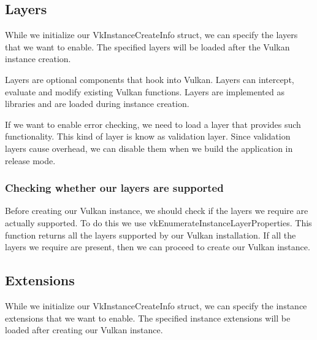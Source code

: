 \begin{minipage}{\linewidth}{\noindent}
    
\end{minipage}

\subsection{Layers}

While we initialize our VkInstanceCreateInfo struct, we can specify the layers
that we want to enable.
The specified layers will be loaded after the Vulkan instance creation.

Layers are optional components that hook into Vulkan.
Layers can intercept, evaluate and modify existing Vulkan functions.
Layers are implemented as libraries and are loaded during instance creation.

If we want to enable error checking, we need to load a layer that
provides such functionality.
This kind of layer is know as validation layer.
Since validation layers cause overhead, we can
disable them when we build the application in release mode.

\begin{minipage}{\linewidth}{\noindent}
    
\end{minipage}

\subsubsection{Checking whether our layers are supported}

Before creating our Vulkan instance, we should check if the layers we require are
actually supported.
To do this we use vkEnumerateInstanceLayerProperties.
This function returns all the layers supported by our Vulkan installation.
If all the layers we require are present, then we can proceed to create our
Vulkan instance.

\subsection{Extensions}

While we initialize our VkInstanceCreateInfo struct, we can specify the instance
extensions that we want to enable.
The specified instance extensions will be loaded after creating our Vulkan instance.

